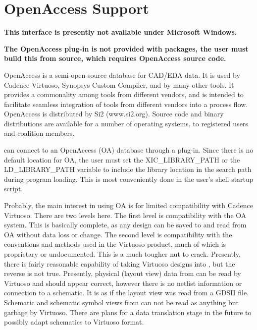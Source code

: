\section{OpenAccess Support}
\label{oaplugin}

{\bf This interface is presently not available under Microsoft Windows.}

{\bf The OpenAccess plug-in is not provided with {\Xic} packages, the
user must build this from source, which requires OpenAccess source
code.  }

OpenAccess is a semi-open-source database for CAD/EDA data.  It is
used by Cadence Virtuoso, Synopsys Custom Compiler, and by many other
tools.  It provides a commonality among tools from different vendors,
and is intended to facilitate seamless integration of tools from
different vendors into a process flow.  OpenAccess is distributed by
Si2 ({\vt www.si2.org}).  Source code and binary distributions are
available for a number of operating systems, to registered users and
coalition members.

{\Xic} can connect to an OpenAccess (OA) database through a plug-in. 
Since there is no default location for OA, the user must set the {\vt
XIC\_LIBRARY\_PATH} or the {\vt LD\_LIBRARY\_PATH} variable to include
the library location in the search path during program loading.  This
is most conveniently done in the user's shell startup script.

Probably, the main interest in using OA is for limited compatibility
with Cadence Virtuoso.  There are two levels here.  The first level is
compatibility with the OA system.  This is basically complete, as any
{\Xic} design can be saved to and read from OA without data loss or
change.  The second level is compatibility with the conventions and
methods used in the Virtuoso product, much of which is proprietary or
undocumented.  This is a much tougher nut to crack.  Presently, there
is fairly reasonable capability of taking Virtuoso designs into
{\Xic}, but the reverse is not true.  Presently, physical (layout
view) data from {\Xic} can be read by Virtuoso and should appear
correct, however there is no netlist information or connection to a
schematic.  It is as if the layout view was read from a GDSII file. 
Schematic and schematic symbol views from {\Xic} can not be read as
anything but garbage by Virtuoso.  There are plans for a data
translation stage in the future to possibly adapt {\Xic} schematics to
Virtuoso format.

